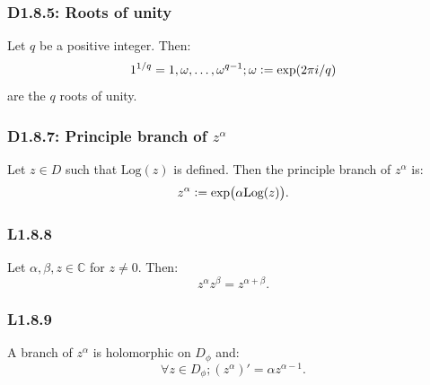 \documentclass{article}
\newcommand{\deq}{\vcentcolon=}
\begin{document}
\begin{multicols*}{3}
\subsubsection*{D1.8.5: Roots of unity}
Let $q$ be a positive integer. Then:
$$1^{1/q}=1,\omega,\dots,\omega^{q-1};
\omega\deq\exp(2\pi i/q)$$
are the $q$ roots of unity.

\subsubsection*{D1.8.7: Principle branch of $z^{\alpha}$}
Let $z\in D$ such that $\text{Log}(z)$ is defined.
Then the principle branch of $z^{\alpha}$ is:
$$z^{\alpha}\deq\exp\bigl(\alpha\text{Log}(z)\bigr).$$

\subsubsection*{L1.8.8}
Let $\alpha,\beta,z\in\mathbb{C}$ for $z\neq0$. Then:
$$z^{\alpha}z^{\beta}=z^{\alpha+\beta}.$$

\subsubsection*{L1.8.9}
A branch of $z^{\alpha}$ is holomorphic on $D_{\phi}$ and:
$$\forall z\in D_{\phi};(z^{\alpha})'=\alpha z^{\alpha-1}.$$

\end{multicols*}
\end{document}
